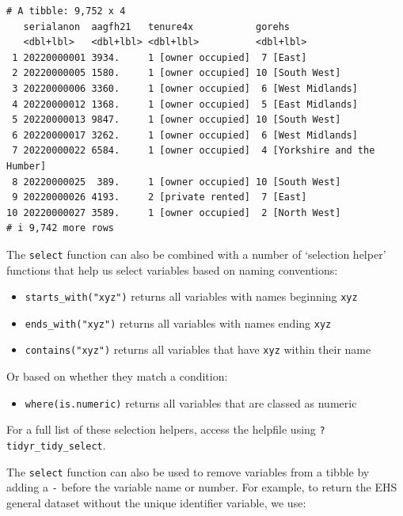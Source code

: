 \documentclass[
  letterpaper,
  DIV=11,
  numbers=noendperiod]{scrreprt}
\providecommand{\tightlist}{%
  \setlength{\itemsep}{0pt}\setlength{\parskip}{0pt}}\usepackage{longtable,booktabs,array}
\begin{document}
\begin{verbatim}
# A tibble: 9,752 x 4
   serialanon  aagfh21   tenure4x           gorehs                       
   <dbl+lbl>   <dbl+lbl> <dbl+lbl>          <dbl+lbl>                    
 1 20220000001 3934.     1 [owner occupied]  7 [East]                    
 2 20220000005 1580.     1 [owner occupied] 10 [South West]              
 3 20220000006 3360.     1 [owner occupied]  6 [West Midlands]           
 4 20220000012 1368.     1 [owner occupied]  5 [East Midlands]           
 5 20220000013 9847.     1 [owner occupied] 10 [South West]              
 6 20220000017 3262.     1 [owner occupied]  6 [West Midlands]           
 7 20220000022 6584.     1 [owner occupied]  4 [Yorkshire and the Humber]
 8 20220000025  389.     1 [owner occupied] 10 [South West]              
 9 20220000026 4193.     2 [private rented]  7 [East]                    
10 20220000027 3589.     1 [owner occupied]  2 [North West]              
# i 9,742 more rows
\end{verbatim}

The \texttt{select} function can also be combined with a number of
`selection helper' functions that help us select variables based on
naming conventions:

\begin{itemize}
\tightlist
\item
  \texttt{starts\_with("xyz")} returns all variables with names
  beginning \texttt{xyz}
\item
  \texttt{ends\_with("xyz")} returns all variables with names ending
  \texttt{xyz}
\item
  \texttt{contains("xyz")} returns all variables that have \texttt{xyz}
  within their name
\end{itemize}

Or based on whether they match a condition:

\begin{itemize}
\tightlist
\item
  \texttt{where(is.numeric)} returns all variables that are classed as
  numeric
\end{itemize}

For a full list of these selection helpers, access the helpfile using
\texttt{?tidyr\_tidy\_select}.

The \texttt{select} function can also be used to remove variables from a
tibble by adding a \texttt{-} before the variable name or number. For
example, to return the EHS general dataset without the unique identifier
variable, we use:
\end{document}
